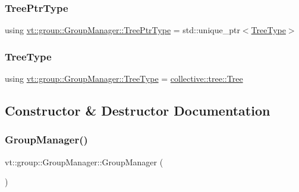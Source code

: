 \subsubsection{\texorpdfstring{Tree\+Ptr\+Type}{TreePtrType}}
{\footnotesize\ttfamily using \hyperlink{structvt_1_1group_1_1_group_manager_a9e0bcb0f3241a19b95d4f7fa092f4c8e}{vt\+::group\+::\+Group\+Manager\+::\+Tree\+Ptr\+Type} =  std\+::unique\+\_\+ptr$<$\hyperlink{structvt_1_1group_1_1_group_manager_a33ca642d5f42e39f033ed4f62613caef}{Tree\+Type}$>$}

\mbox{\label{structvt_1_1group_1_1_group_manager_a33ca642d5f42e39f033ed4f62613caef}} 
\subsubsection{\texorpdfstring{Tree\+Type}{TreeType}}
{\footnotesize\ttfamily using \hyperlink{structvt_1_1group_1_1_group_manager_a33ca642d5f42e39f033ed4f62613caef}{vt\+::group\+::\+Group\+Manager\+::\+Tree\+Type} =  \hyperlink{structvt_1_1collective_1_1tree_1_1_tree}{collective\+::tree\+::\+Tree}}



\subsection{Constructor \& Destructor Documentation}
\mbox{\label{structvt_1_1group_1_1_group_manager_acfab15afbf80d7b0aa8d95171167b251}} 
\subsubsection{\texorpdfstring{Group\+Manager()}{GroupManager()}}
{\footnotesize\ttfamily vt\+::group\+::\+Group\+Manager\+::\+Group\+Manager (\begin{DoxyParamCaption}{ }\end{DoxyParamCaption})}

\mbox{\label{structvt_1_1group_1_1_group_manager_a87c2b3dc934de17d0ec1372957b234e5}} 
